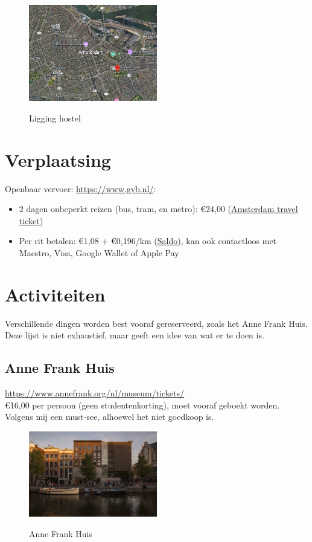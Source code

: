 \documentclass[a4paper, 12pt]{article}
\begin{document}
\begin{figure}
    \centering
    \includegraphics[width=0.5\textwidth]{ligging.png}\label{fig:ligging}
    \caption{Ligging hostel}
\end{figure}

\section{Verplaatsing}

Openbaar vervoer: \url{https://www.gvb.nl/}:
\begin{itemize}
    \item 2 dagen onbeperkt reizen (bus, tram, en metro): €24,00 (\hyperlink{https://www.gvb.nl/reisproducten/toeristen/amsterdam-travel-ticket}{Amsterdam travel ticket})
    \item Per rit betalen: €1,08 + €0,196/km (\hyperlink{https://www.gvb.nl/reisproducten/saldo/saldo}{Saldo}),
     kan ook contactloos met Maestro, Visa, Google Wallet of Apple Pay
\end{itemize}

\section{Activiteiten}

Verschillende dingen worden best vooraf gereserveerd, zoals het Anne Frank Huis.
Deze lijst is niet exhaustief, maar geeft een idee van wat er te doen is.

\subsection{Anne Frank Huis}
\url{https://www.annefrank.org/nl/museum/tickets/}\\
€16,00 per persoon (geen studentenkorting), moet vooraf geboekt worden.\\
Volgens mij een must-see, alhoewel het niet goedkoop is.

\begin{figure}[h]
    \centering
    \includegraphics[width=0.5\textwidth]{anne_frank.jpg}\label{fig:anne_frank}
    \caption{Anne Frank Huis}
\end{figure}
\end{document}
